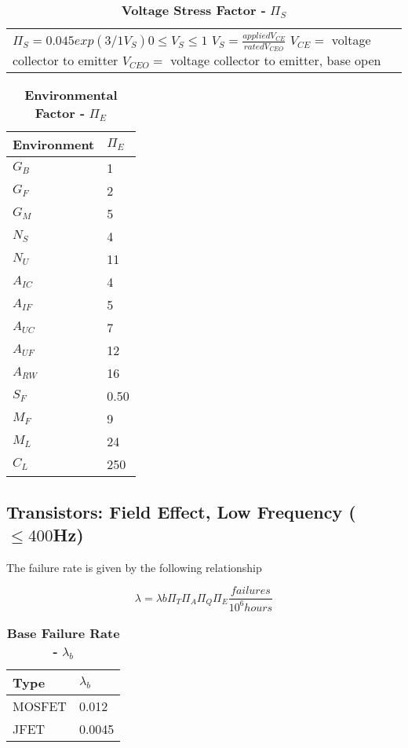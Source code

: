 \begin{table}
\caption{\textbf{Voltage Stress Factor -} $\Pi_{S}$}
\label{table:voltStressFactorTransHigh}
\begin{tabular}{l} 
$\Pi_{S} = 0.045exp(3/1V_{S}) 0 \leq V_{S} \leq 1$
$V_{S} = \frac{applied V_{CE}}{rated V_{CEO}}$
$V_{CE} =$ voltage collector to emitter
$V_{CEO} = $ voltage collector to emitter, base open
\end{tabular}
\end{table}


\begin{table}
\caption{\textbf{Environmental Factor -} $\Pi_{E}$}
\label{table:enviroFactorTransHigh}
\begin{tabular}{|l|m{10cm}|} \hline
\textbf{Environment} & $\Pi_{E}$ \\ \hline
$G_{B}$ & 1 \\ \hline
$G_{F}$ & 2 \\ \hline
$G_{M}$ & 5 \\ \hline
$N_{S}$ & 4 \\ \hline
$N_{U}$ & 11 \\ \hline
$A_{IC}$ & 4 \\ \hline
$A_{IF}$ & 5 \\ \hline
$A_{UC}$ & 7 \\ \hline
$A_{UF}$ & 12 \\ \hline
$A_{RW}$ & 16 \\ \hline
$S_{F}$ & 0.50 \\ \hline
$M_{F}$ & 9 \\ \hline
$M_{L}$ & 24 \\ \hline
$C_{L}$ & 250 \\ \hline
\end{tabular}
\end{table}




\subsection{Transistors: Field Effect, Low Frequency ($\leq 400$Hz)}
\label{subsection:transistors-field-effect-low-frequency-400mhz}

The failure rate is given by the following relationship

$$\lambda = \lambda{b} \Pi_{T} \Pi_{A} \Pi_{Q} \Pi_{E} \frac{failures}{10^{6} hours}$$


\begin{table}
\caption{\textbf{Base Failure Rate -} $\lambda_{b}$}
\label{table:baseFailRateMosLow}
\begin{tabular}{|l|m{10cm}|} \hline
\textbf{Type} & $\lambda_{b}$ \\ \hline
MOSFET & 0.012 \\ \hline
JFET & 0.0045 \\ \hline
\end{tabular}
\end{table}


